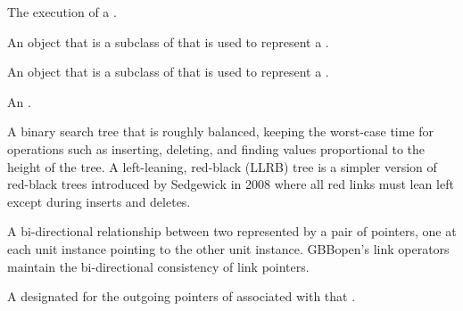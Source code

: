 \begin{glossary-list}

\glent[KS~execution]
%
%
%
%
%
The execution of a .


\glent[ks~class]
%
%
%
%
%
An object that is a subclass of
 that is used to represent a
.


%
%
%
%
%
An object that is a subclass of
 that is used to represent a
.


%
%
An .


%
%
A binary search tree that is roughly balanced, keeping the worst-case time for
operations such as inserting, deleting, and finding values proportional to the
height of the tree. A left-leaning, red-black (LLRB) tree is a simpler version
of red-black trees introduced by Sedgewick in 2008 where all red links must
lean left except during inserts and deletes.


\glent[link]
%
%
%
A bi-directional relationship between two  represented
by a pair of pointers, one at each unit instance pointing to the other unit
instance.  GBBopen's link operators maintain the bi-directional consistency of
link pointers.


%
%
%
A  designated for the outgoing pointers of 
associated with that .


\end{glossary-list}
